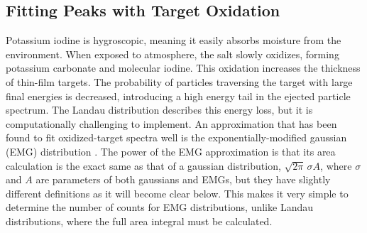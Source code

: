
\subsection{Fitting Peaks with Target Oxidation} \label{subsec:oxidation}

Potassium iodine is hygroscopic, meaning it easily absorbs moisture from the environment. When exposed to atmosphere, the salt slowly oxidizes, forming potassium carbonate and molecular iodine. This oxidation increases the thickness of thin-film targets. The probability of particles traversing the target with large final energies is decreased, introducing a high energy tail in the ejected particle spectrum. The Landau distribution describes this energy loss, but it is computationally challenging to implement. An approximation that has been found to fit oxidized-target spectra well is the exponentially-modified gaussian (EMG) distribution \cite{Babu2016}. The power of the EMG approximation is that its area calculation is the exact same as that of a gaussian distribution, $\sqrt{2\pi} \, \sigma A$, where $\sigma$ and $A$ are parameters of both gaussians and EMGs, but they have slightly different definitions as it will become clear below. This makes it very simple to determine the number of counts for EMG distributions, unlike Landau distributions, where the full area integral must be calculated.


